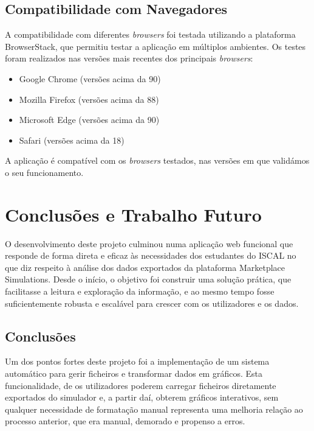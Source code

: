 \section{Compatibilidade com Navegadores}

A compatibilidade com diferentes \textit{browsers} foi testada utilizando a plataforma BrowserStack, que permitiu testar a aplicação em múltiplos ambientes. Os testes foram realizados nas versões mais recentes dos principais \textit{browsers}:

\begin{itemize}
    \item Google Chrome (versões acima da 90)
    \item Mozilla Firefox (versões acima da 88)
    \item Microsoft Edge (versões acima da 90)
    \item Safari (versões acima da 18)
\end{itemize}

A aplicação é compatível com os \textit{browsers} testados, nas versões em que validámos o seu funcionamento.

\chapter{Conclusões e Trabalho Futuro}
\label{ch:conclusoesTrabalhoFuturo}

O desenvolvimento deste projeto culminou numa aplicação web funcional que responde de forma direta e eficaz às necessidades dos estudantes do ISCAL no que diz respeito à análise dos dados exportados da plataforma Marketplace Simulations. Desde o início, o objetivo foi construir uma solução prática, que facilitasse a leitura e exploração da informação, e ao mesmo tempo fosse suficientemente robusta e escalável para crescer com os utilizadores e os dados.

\section{Conclusões}

Um dos pontos fortes deste projeto foi a implementação de um sistema automático para gerir ficheiros e transformar dados em gráficos. Esta funcionalidade, de os utilizadores poderem carregar ficheiros diretamente exportados do simulador e, a partir daí, obterem gráficos interativos, sem qualquer necessidade de formatação manual representa uma melhoria relação ao processo anterior, que era manual, demorado e propenso a erros. 

